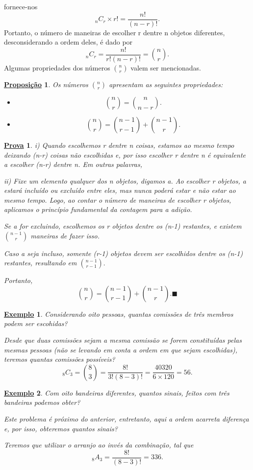 \documentclass{article}
\newtheorem*{prop*}{\underline{Proposi\c c\~ao}}
\newtheorem{example}{\underline{Exemplo}}
\newtheorem*{proof*}{\underline{Prova}}
\renewcommand\qedsymbol{$\blacksquare$}
\begin{document}
fornece-nos 
\[
  _{n}C_{r}\times r! = \frac{n!}{(n-r)!}.
\]
Portanto, o número de maneiras de escolher r dentre n objetos diferentes, desconsiderando
a ordem deles, é dado por 
\[
  _{n}C_{r} = \frac{n!}{r!(n-r)!} = \binom{n}{r}.
\]
Algumas propriedades dos números \(\binom{n}{r}\) valem ser mencionadas.
\begin{prop*}
  Os números \(\binom{n}{r}\) apresentam as seguintes propriedades:
  \begin{itemize}
    \item[i)]   
      \[
        \binom{n}{r} = \binom{n}{n-r}.
      \]
    \item[ii)] 
      \[
        \binom{n}{r} = \binom{n-1}{r-1} + \binom{n-1}{r}.
      \]
  \end{itemize}
\end{prop*}
\begin{proof*}
  i) Quando escolhemos r dentre n coisas, estamos ao mesmo tempo deixando (n-r) coisas não escolhidas e, por isso
  escolher r dentre n é equivalente a escolher (n-r) dentre n. Em outras palavras, 

  ii) Fixe um elemento qualquer dos n objetos, digamos a. Ao escolher r objetos, a estará incluído ou excluído entre eles,
  mas nunca poderá estar e não estar ao mesmo tempo. Logo, ao contar o número de maneiras de escolher r objetos,
  aplicamos o princípio fundamental da contagem para a adição. 

  Se a for excluindo, escolhemos os r objetos dentre os (n-1) restantes, e existem \(\binom{n-1}{r}\) maneiras de fazer isso. 

  Caso a seja incluso, somente (r-1) objetos devem ser escolhidos dentre os (n-1) restantes, resultando em \(\binom{n-1}{r-1}.\)

  Portanto, 
  \[
    \binom{n}{r} = \binom{n-1}{r-1} + \binom{n-1}{r}.\text{\qedsymbol}
  \]
\end{proof*}
\begin{example}
  Considerando oito pessoas, quantas comissões de três membros podem ser escohidas?

  Desde que duas comissões sejam a mesma comissão se forem constituídas pelas mesmas pessoas
  (não se levando em conta a ordem em que sejam escolhidas), teremos quantas comissões possíveis? 
  \[
    _{8}C_{3} = \binom{8}{3} = \frac{8!}{3!(8-3)!} = \frac{40320}{6\times 120} = 56.
  \]
\end{example}
\begin{example}
  Com oito bandeiras diferentes, quantos sinais, feitos com três bandeiras podemos obter?

  Este problema é próximo do anterior, entretanto, aqui a ordem acarreta diferença e, por isso, obteremos quantos sinais?

  Teremos que utilizar o arranjo ao invés da combinação, tal que 
  \[
    _{8}A_{3} = \frac{8!}{(8-3)!} = 336.
  \]
\end{example}
\end{document}
